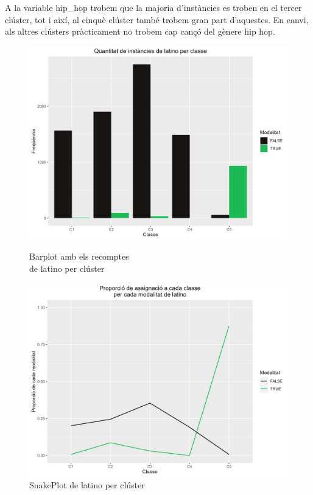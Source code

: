 \documentclass{article}
\begin{document}
A la variable hip\_hop trobem que la majoria d'instàncies es troben en el tercer clúster, tot i així, al cinquè clúster també trobem gran part d'aquestes. En canvi, als altres clústers pràcticament no trobem cap cançó del gènere hip hop.

\begin{figure}[H]
\centering
    \begin{minipage}{.49\textwidth}
        \centering
        \includegraphics[width=0.95\linewidth]{Images/5_Profiling/categoriques/cat/Cat_BarPlot_latino.png}
        \caption{Barplot amb els recomptes \\ de latino per clúster}
        \label{fig:Cat_BarPlot_latino}
    \end{minipage}%
    \begin{minipage}{.49\textwidth}
        \centering
        \includegraphics[width=0.95\linewidth]{Images/5_Profiling/categoriques/cat/Cat_SnakePlot_latino.png}
        \caption{SnakePlot de latino per clúster}
        \label{fig:Cat_SnakePlot_latino}
    \end{minipage}%
\end{figure}
\end{document}
